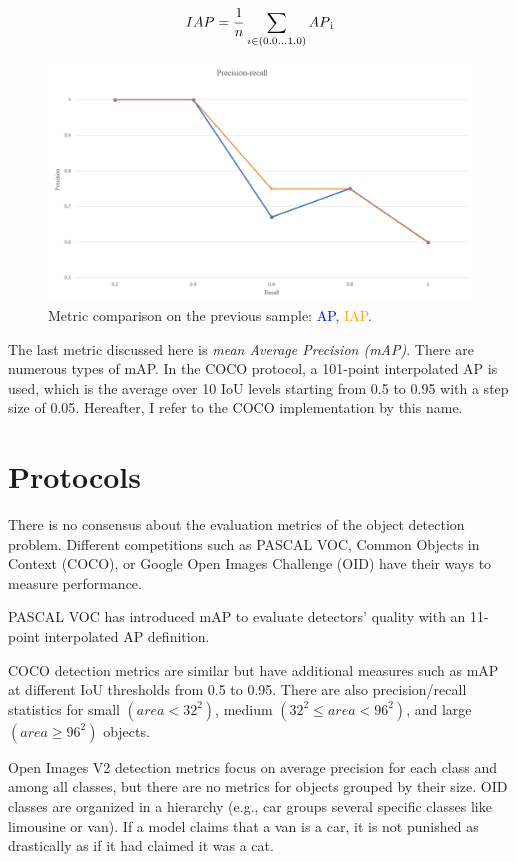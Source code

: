 \[IAP=\frac{1}{n}\sum_{i\in(0.0 ... 1.0)} AP\textsubscript{i}\]

\begin{figure}[htb]
 \centerline{\includegraphics[width=0.8\columnwidth]{.//Figure/Detector/transformed_precision_recall.png}}
 \caption{Metric comparison on the previous sample: \textcolor{blue}{AP}, \textcolor{orange}{IAP}.}
 \label{fig:transformed_precision_recall}
\end{figure}

The last metric discussed here is \textit{mean Average Precision (mAP)}. There are numerous types of mAP. In the COCO\cite{MS-COCO} protocol, a 101-point interpolated AP is used, which is the average over 10 IoU levels starting from 0.5 to 0.95 with a step size of 0.05. Hereafter, I refer to the COCO implementation by this name.

\section{Protocols}

There is no consensus about the evaluation metrics of the object detection problem. Different competitions such as PASCAL VOC\cite{PascalVOC}, Common Objects in Context\cite{MS-COCO} (COCO), or Google Open Images Challenge\cite{OID} (OID) have their ways to measure performance\cite{mAP}.

PASCAL VOC\cite{PascalVOC} has introduced mAP to evaluate detectors' quality with an 11-point interpolated AP definition.

COCO detection metrics\cite{MS-COCO} are similar but have additional measures such as mAP at different IoU thresholds from 0.5 to 0.95. There are also precision/recall statistics for small \((area < 32^2)\), medium \((32^2 \leq area < 96^2)\), and large \((area \geq 96^2)\) objects.

Open Images V2 detection metrics\cite{OID} focus on average precision for each class and among all classes, but there are no metrics for objects grouped by their size. OID classes are organized in a hierarchy (e.g., car groups several specific classes like limousine or van). If a model claims that a van is a car, it is not punished as drastically as if it had claimed it was a cat.

